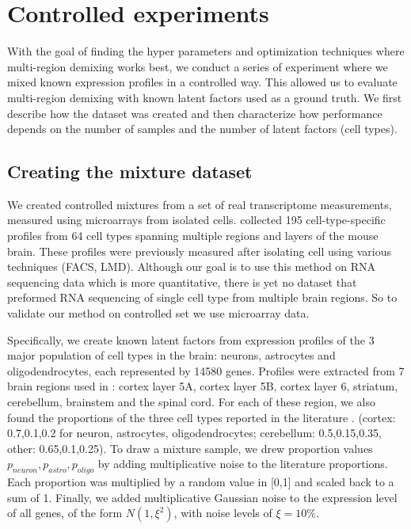 \documentclass{article} %
\begin{document}
\section{Controlled experiments}
\label{Synthetic_exp}
With the goal of finding the hyper parameters and optimization techniques where multi-region demixing works best, we conduct a series of experiment where we mixed known expression profiles in a controlled way. This allowed us to evaluate multi-region demixing with known latent factors used as a ground truth. We first describe how the dataset was created and then characterize how performance depends on the number of samples and the number of latent factors (cell types).

\subsection{Creating the mixture dataset}
\vspace{-5pt}
We created controlled mixtures from a set of real transcriptome measurements, measured using microarrays from isolated cells. \citet{okaty2011cell} collected 195 cell-type-specific profiles from 64 cell types spanning multiple regions and layers of the mouse brain. These profiles were previously measured after isolating cell using various techniques (FACS, LMD). Although our goal is to use this method on RNA sequencing data which is more quantitative, there is yet no dataset that preformed RNA sequencing of single cell type from multiple brain regions. So to validate our method on controlled set we use microarray data.

Specifically, we create known latent factors from expression profiles of the 3 major population of cell types in the brain: neurons, astrocytes and oligodendrocytes, each represented by 14580 genes. Profiles were extracted from 7 brain regions used in \citet{doyle2008}:  cortex layer 5A, cortex layer 5B, cortex layer 6, striatum, cerebellum, brainstem and the spinal cord. For each of these region, we also found the proportions of the three cell types reported in the literature \cite{Herculano2014}. (cortex:  0.7,0.1,0.2 for neuron, astrocytes, oligodendrocytes; cerebellum: 0.5,0.15,0.35, other: 0.65,0.1,0.25). To draw a mixture sample, we drew proportion values $p_{neuron},p_{astro},p_{oligo}$ by adding multiplicative noise to the literature proportions. Each proportion was multiplied by a random value in [0,1] and scaled back to a  sum of 1. Finally, we added multiplicative Gaussian noise to the expression level of all genes, of the form $N(1,\xi^2)$, with noise levels of $\xi=10\%$.
\end{document}
